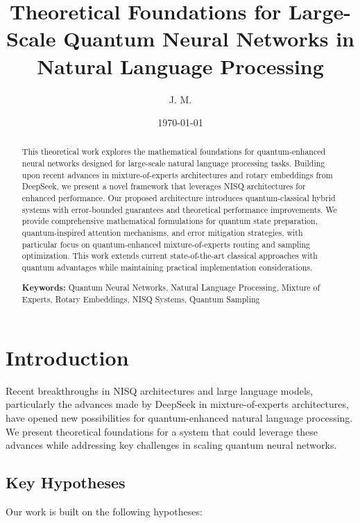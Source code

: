 \documentclass{article}
\title{Theoretical Foundations for Large-Scale Quantum Neural Networks in Natural Language Processing}
\author{J. M.}
\date{\today}
\begin{document}
\maketitle

\begin{abstract}
This theoretical work explores the mathematical foundations for quantum-enhanced neural networks designed for large-scale natural language processing tasks. Building upon recent advances in mixture-of-experts architectures and rotary embeddings from DeepSeek, we present a novel framework that leverages NISQ architectures for enhanced performance. Our proposed architecture introduces quantum-classical hybrid systems with error-bounded guarantees and theoretical performance improvements. We provide comprehensive mathematical formulations for quantum state preparation, quantum-inspired attention mechanisms, and error mitigation strategies, with particular focus on quantum-enhanced mixture-of-experts routing and sampling optimization. This work extends current state-of-the-art classical approaches with quantum advantages while maintaining practical implementation considerations.

\textbf{Keywords:} Quantum Neural Networks, Natural Language Processing, Mixture of Experts, Rotary Embeddings, NISQ Systems, Quantum Sampling
\end{abstract}

\section{Introduction}
Recent breakthroughs in NISQ architectures and large language models, particularly the advances made by DeepSeek in mixture-of-experts architectures, have opened new possibilities for quantum-enhanced natural language processing. We present theoretical foundations for a system that could leverage these advances while addressing key challenges in scaling quantum neural networks.

\subsection{Key Hypotheses}
Our work is built on the following hypotheses:
\end{document}

